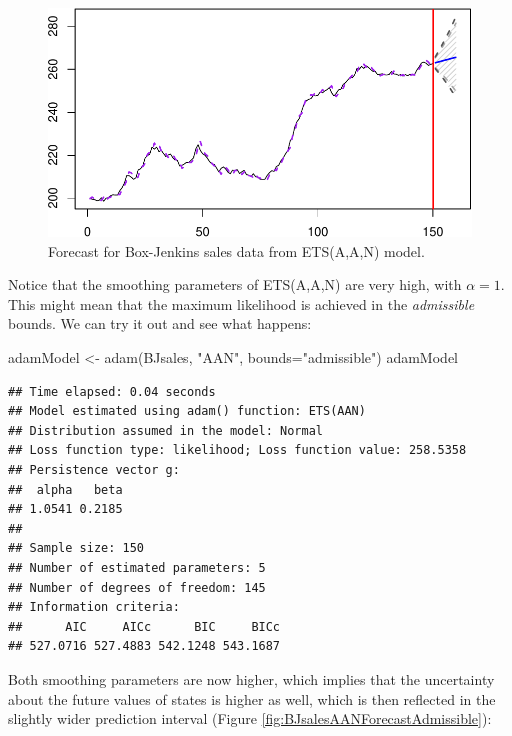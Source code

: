 \documentclass[
]{book}
\newenvironment{Shaded}{\begin{snugshade}}{\end{snugshade}}
\newcommand{\AttributeTok}[1]{\textcolor[rgb]{0.77,0.63,0.00}{#1}}
\newcommand{\FunctionTok}[1]{\textcolor[rgb]{0.00,0.00,0.00}{#1}}
\newcommand{\NormalTok}[1]{#1}
\newcommand{\OtherTok}[1]{\textcolor[rgb]{0.56,0.35,0.01}{#1}}
\newcommand{\StringTok}[1]{\textcolor[rgb]{0.31,0.60,0.02}{#1}}
\theoremstyle{definition}
\theoremstyle{definition}
\theoremstyle{definition}
\theoremstyle{definition}
\theoremstyle{remark}
\begin{document}
\begin{figure}
\centering
\includegraphics{Svetunkov--2022----ADAM_files/figure-latex/BJsalesAANForecast-1.pdf}
\caption{\label{fig:BJsalesAANForecast}Forecast for Box-Jenkins sales data from ETS(A,A,N) model.}
\end{figure}

Notice that the smoothing parameters of ETS(A,A,N) are very high, with \(\alpha=1\). This might mean that the maximum likelihood is achieved in the \emph{admissible} bounds. We can try it out and see what happens:

\begin{Shaded}
\begin{Highlighting}[]
\NormalTok{adamModel }\OtherTok{\textless{}{-}} \FunctionTok{adam}\NormalTok{(BJsales, }\StringTok{"AAN"}\NormalTok{, }\AttributeTok{bounds=}\StringTok{"admissible"}\NormalTok{)}
\NormalTok{adamModel}
\end{Highlighting}
\end{Shaded}

\begin{verbatim}
## Time elapsed: 0.04 seconds
## Model estimated using adam() function: ETS(AAN)
## Distribution assumed in the model: Normal
## Loss function type: likelihood; Loss function value: 258.5358
## Persistence vector g:
##  alpha   beta 
## 1.0541 0.2185 
## 
## Sample size: 150
## Number of estimated parameters: 5
## Number of degrees of freedom: 145
## Information criteria:
##      AIC     AICc      BIC     BICc 
## 527.0716 527.4883 542.1248 543.1687
\end{verbatim}

Both smoothing parameters are now higher, which implies that the uncertainty about the future values of states is higher as well, which is then reflected in the slightly wider prediction interval (Figure \ref{fig:BJsalesAANForecastAdmissible}):
\end{document}
